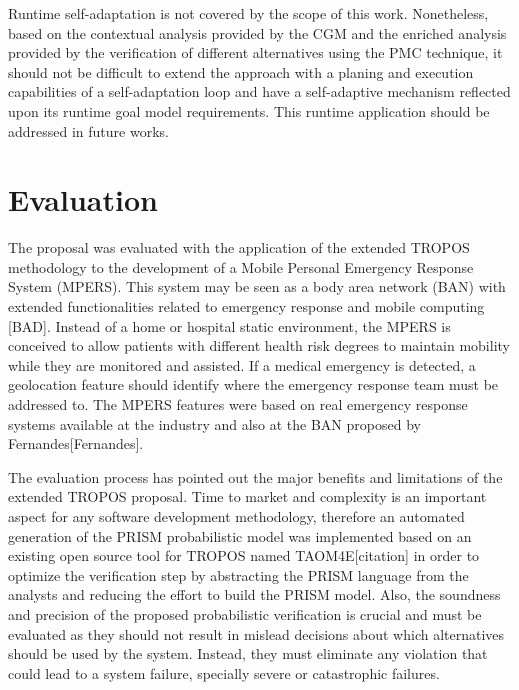 Runtime self-adaptation is not covered by the scope of this work. Nonetheless, based on the contextual analysis provided by the CGM and the enriched analysis provided by the verification of different alternatives using the PMC technique, it should not be difficult to extend the approach with a planing and execution capabilities of a self-adaptation loop and have a self-adaptive mechanism reflected upon its runtime goal model requirements. This runtime application should be addressed in future works.




\section{Evaluation}

The proposal was evaluated with the application of the extended TROPOS methodology to the development of a Mobile Personal Emergency Response System (MPERS). This system may be seen as a body area network (BAN) with extended functionalities related to emergency response and mobile computing [BAD]. Instead of a home or hospital static environment, the MPERS is conceived to allow patients with different health risk degrees to maintain mobility while they are monitored and assisted. If a medical emergency is detected, a geolocation feature should identify where the emergency response team must be addressed to. The MPERS features were based on real emergency response systems available at the industry and also at the BAN proposed by Fernandes[Fernandes].

The evaluation process has pointed out the major benefits and limitations of the extended TROPOS proposal. Time to market and complexity is an important aspect for any software development methodology, therefore an automated generation of the PRISM probabilistic model was implemented based on an existing open source tool for TROPOS named TAOM4E[citation] in order to optimize the verification step by abstracting the PRISM language from the analysts and reducing the effort to build the PRISM model.  Also, the soundness and precision of the proposed probabilistic verification is crucial and must be evaluated as they should not result in mislead decisions about which alternatives should be used by the system. Instead, they must eliminate any violation that could lead to a system failure, specially severe or catastrophic failures.

